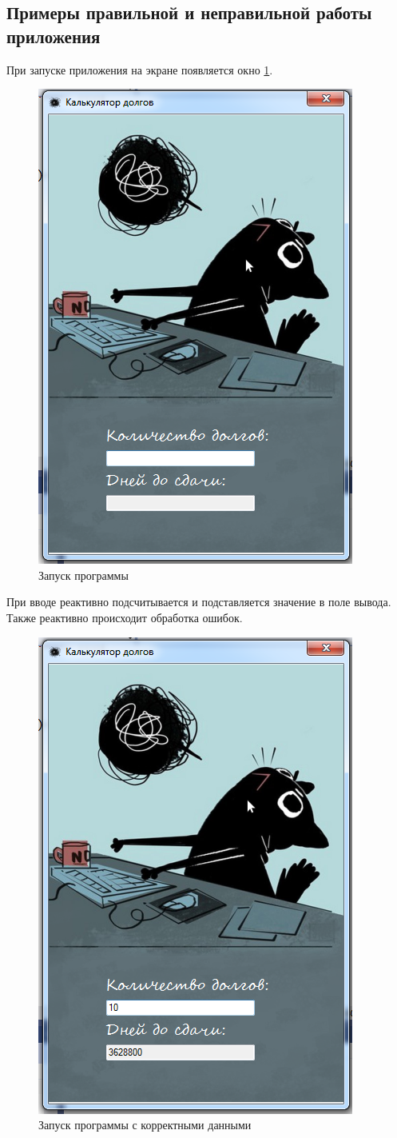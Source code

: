 \subsection{Примеры правильной и неправильной работы приложения}
При запуске приложения на экране появляется окно \ref{fig:factorial-start}.
\begin{figure}
  \centering
  \includegraphics[width=0.5\linewidth]{images/factorial/start.png}
  \caption{Запуск программы}
  \label{fig:factorial-start}
\end{figure}

При вводе реактивно подсчитывается и подставляется значение в поле вывода. Также реактивно происходит обработка ошибок.

\begin{figure}
  \centering
  \includegraphics[width=0.5\linewidth]{images/factorial/okay.png}
  \caption{Запуск программы с корректными данными}
  \label{fig:factorial-okay}
\end{figure}

